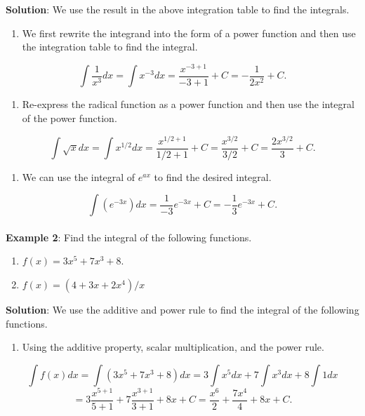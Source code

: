 \documentclass[
]{book}
\providecommand{\tightlist}{%
  \setlength{\itemsep}{0pt}\setlength{\parskip}{0pt}}
\begin{document}
\textbf{Solution}: We use the result in the above integration table to find the integrals.

\begin{enumerate}
\def\labelenumi{\arabic{enumi}.}
\tightlist
\item
  We first rewrite the integrand into the form of a power function and then use the integration table to find the integral.
\end{enumerate}

\[
\int \frac{1}{x^3} dx = \int x^{-3} dx = \frac{x^{-3 + 1}}{-3 + 1} + C = -\frac{1}{2x^2} + C.
\]

\begin{enumerate}
\def\labelenumi{\arabic{enumi}.}
\setcounter{enumi}{1}
\tightlist
\item
  Re-express the radical function as a power function and then use the integral of the power function.
\end{enumerate}

\[
\int \sqrt{x} dx = \int x^{1/2} dx =  \frac{x^{1/2+1}}{1/2 + 1} + C = \frac{x^{3/2}}{3/2} + C = \frac{2x^{3/2}}{3} + C.
\]

\begin{enumerate}
\def\labelenumi{\arabic{enumi}.}
\setcounter{enumi}{2}
\tightlist
\item
  We can use the integral of \(e^{ax}\) to find the desired integral.
\end{enumerate}

\[
\int (e^{-3x}) dx = \frac{1}{-3}e^{-3x} + C = -\frac{1}{3}e^{-3x} + C.
\]\\

\textbf{Example 2}: Find the integral of the following functions.

\begin{enumerate}
\def\labelenumi{\arabic{enumi}.}
\item
  \(f(x) =3x^5 + 7x^3 + 8\).
\item
  \(f(x) = (4 + 3x + 2x^4)/x\)
\end{enumerate}

\textbf{Solution}: We use the additive and power rule to find the integral of the following functions.

\begin{enumerate}
\def\labelenumi{\arabic{enumi}.}
\tightlist
\item
  Using the additive property, scalar multiplication, and the power rule.
\end{enumerate}

\[
\int f(x)dx =\int(3x^5 + 7x^3 + 8)dx  = 3\int x^5 dx + 7\int x^3 dx + 8\int 1 dx 
\]
\[
=  3 \frac{x^{5+1}}{5+1} + 7\frac{x^{3+1}}{3+1} + 8 x + C = \frac{x^6}{2} + \frac{7x^4}{4} + 8x +C.
\]
\end{document}
